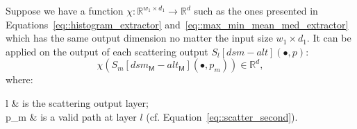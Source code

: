             Suppose we have a function \(\chi: \mathbb{R}^{w_1 \times d_1} \rightarrow \mathbb{R}^d\) such as the ones presented in Equations~\ref{eq::histogram_extractor} and~\ref{eq::max_min_mean_med_extractor} which has the same output dimension no matter the input size \(w_1 \times d_1\).
            It can be applied on the output of each scattering output \(S_l[dsm - alt](\bullet, p)\):
            \begin{equation}
                \label{eq::reduced_scattering}
                \chi \left(S_m[dsm_{\mathsf{M}} - alt_{\mathsf{M}}]\left(\bullet, p_m\right)\right) \in \mathbb{R}^d,
            \end{equation}
            where:
            \begin{conditions}
                l & is the scattering output layer;\\
                p_m & is a valid path at layer \(l\) (cf. Equation~\ref{eq::scatter_second}). 
            \end{conditions}
            
